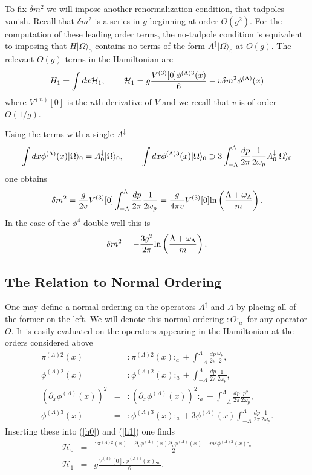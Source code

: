 \def\letter{0}\def\pr{0}\documentclass[a4paper,12pt, epsfig]{article}
\def\hsp{,\hspace{.7cm}}
\renewcommand{\(}{\begin{equation}}
\renewcommand{\)}{end{equation} \vspace{-.05in}\linebreak}
\renewcommand{\=}{\hspace{-.03in}=\hspace{-.02in}}
\renewcommand{\(}{\begin{equation}}
\renewcommand{\)}{\end{equation}}
\renewcommand{\hsp}{,\hspace{.3in}}
\renewcommand{\(}{\begin{equation}}
\renewcommand{\)}{\end{equation}}
\def\lpin#1{\int^\Lambda_{-\Lambda} \frac{d#1}{2\pi}}
\renewcommand{\L}{{(\Lambda)}}
\def\mh{\mathcal{H}}
\newcommand{\beq}{\begin{equation}}
\newcommand{\eeq}{\end{equation}}
\newcommand{\bea}{\begin{eqnarray}}
\newcommand{\eea}{\end{eqnarray}}
\begin{document}
To fix $\delta m^2$ we will impose another renormalization condition, that tadpoles vanish.  Recall that $\delta m^2$ is a series in $g$ beginning at order $O(g^2)$. For the computation of these leading order terms, the no-tadpole condition is equivalent to imposing that $H|\Omega\rangle_0$ contains no terms of the form $A^\ddag|\Omega\rangle_0$ at $O(g)$.  The relevant $O(g)$ terms in the Hamiltonian are
\beq
H_{1}=\int dx \mh_{1}\hsp
\mh_{1}=g\frac{V^{(3)}[0]\phi^{\L 3}(x)}{6}-v\delta m^2\phi^\L(x) \label{h1}
\eeq
where $V^{(n)}[0]$ is the $n$th derivative of $V$ and we recall that $v$ is of order $O(1/g)$.%

Using the terms with a single $A^\ddag$
\beq
\int dx \phi^\L(x)|\Omega\rangle_0=A^\ddag_0|\Omega\rangle_0\hsp
\int dx \phi^{\L 3}(x)|\Omega\rangle_0\supset 3\lpin{p}\frac{1}{2\omega_p}A^\ddag_0|\Omega\rangle_0
\eeq
one obtains
\beq
\delta m^2=\frac{g}{2v}V^{(3)}[0]\lpin{p}\frac{1}{2\omega_p}=\frac{g}{4\pi v}V^{(3)}[0]{\rm{ln}}\left(\frac{\Lambda+\omega_\Lambda}{m}\right).
\eeq
In the case of the $\phi^4$ double well this is
\beq
\delta m^2=-\frac{3g^2}{2\pi}{\rm{ln}}\left(\frac{\Lambda+\omega_\Lambda}{m}\right).
\eeq

\subsection{The Relation to Normal Ordering}

One may define a normal ordering on the operators $A^\ddag$ and $A$ by placing all of the former on the left.  We will denote this normal ordering $:O:_a$ for any operator $O$.  It is easily evaluated on the operators appearing in the Hamiltonian at the orders considered above
\bea
\pi^{\L 2}(x)&=&:\pi^{\L 2}(x):_a+\lpin{p}\frac{\omega_p}{2},\\
\phi^{\L 2}(x)&=&:\phi^{\L 2}(x):_a+\lpin{p}\frac{1}{2\omega_p}\nonumber,\\
\left(\partial_x\phi^{\L}(x)\right)^2&=&:\left(\partial_x\phi^{\L}(x)\right)^2:_a+\lpin{p}\frac{p^2}{2\omega_p}\nonumber,\\
\phi^{\L 3}(x)&=&:\phi^{\L 3}(x):_a+3\phi^\L(x)\lpin{p}\frac{1}{2\omega_p}\nonumber.
\eea
Inserting these into (\ref{h0}) and (\ref{h1}) one finds
\bea
\mh_{0}&=&\frac{:\pi^{\L 2}(x)+\partial_x {\phi}^\L (x)\partial_x {\phi}^\L (x)+m^2\phi^{\L 2}(x):_a}{2} \nonumber\\
\mh_{1}&=&g\frac{V^{(3)}[0]:\phi^{\L 3}(x):_a}{6}.
\eea
\end{document}
